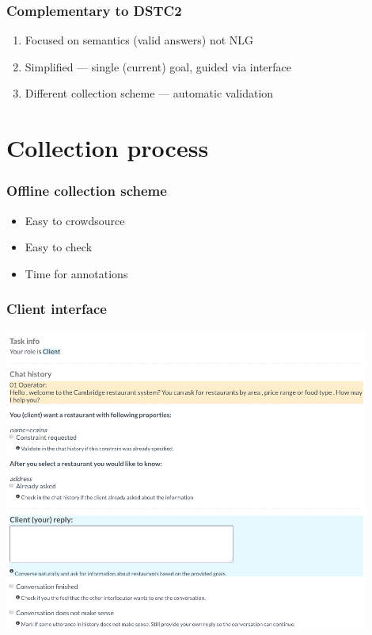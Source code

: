\documentclass[10pt, compress,british,xcolor={svgnames,dvipsnames,x11names},trans]{beamer}
\begin{document}
\begin{frame}\frametitle{Complementary to DSTC2\cite{henderson2014dstc2}}
    \begin{enumerate}
        \item Focused on semantics (valid answers) not NLG
        \item Simplified --- single (current) goal, guided via interface  
        \item Different collection scheme --- automatic validation
    \end{enumerate}
\end{frame}


\section{Collection process}

\begin{frame}\frametitle{Offline collection scheme}
    \begin{itemize}
        \item Easy to crowdsource
        \item Easy to check 
        \item Time for annotations\cite{wen2016network}
    \end{itemize}
\end{frame}

\begin{frame}\frametitle{Client interface}
    \includegraphics[width=0.90\textwidth]{./gui-annotators-client.png}
\end{frame}
\end{document}
